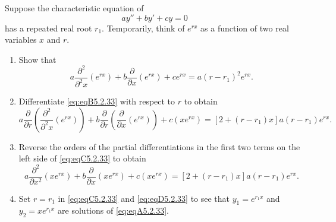\documentclass{ximera}
\begin{document}
\begin{problem}\label{exer:5.2.33}
Suppose the characteristic equation of \begin{equation}\label{eq:eqA5.2.33}
ay''+by'+cy=0
\end{equation}
has a repeated real root $r_1$. Temporarily, think of $e^{rx}$
as a function of two real variables $x$ and $r$.
\begin{enumerate}
\item %
Show that \begin{equation}\label{eq:eqB5.2.33}
a\frac{\partial^2}{\partial^2 x}(e^{rx})+b\frac{\partial}{\partial
x}(e^{rx}) +ce^{rx}=a(r-r_1)^2e^{rx}.
\end{equation}
\item %
Differentiate \ref{eq:eqB5.2.33} with respect to $r$  to obtain \begin{equation}\label{eq:eqC5.2.33}
a\frac{\partial}{\partial r}\left(\frac{\partial^2}{\partial^2
x}(e^{rx})\right)+b\frac{\partial}{\partial r}\left(\frac{\partial
}{\partial x}(e^{rx})\right)
+c(xe^{rx})=[2+(r-r_1)x]a(r-r_1)e^{rx}.
\end{equation}
\item %
Reverse the orders of the partial differentiations in the first two
terms on the left side of
\ref{eq:eqC5.2.33} to obtain \begin{equation}\label{eq:eqD5.2.33}
a\frac{\partial^2}{\partial x^2}(xe^{rx})+b\frac{\partial}{\partial
x}(xe^{rx})+c(xe^{rx})=[2+(r-r_1)x]a(r-r_1)e^{rx}.
\end{equation}
\item %
Set $r=r_1$ in \ref{eq:eqC5.2.33} and \ref{eq:eqD5.2.33}
to see that $y_1=e^{r_1x}$ and $y_2=xe^{r_1x}$ are solutions
of \ref{eq:eqA5.2.33}.
\end{enumerate}
\end{problem}
\end{document}
